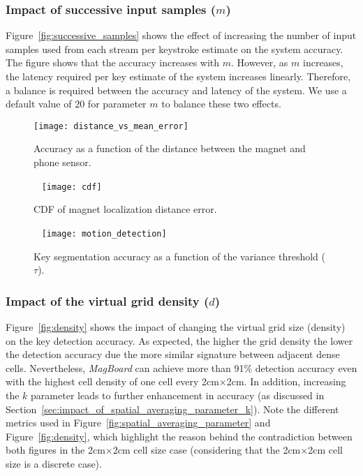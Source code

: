 \documentclass[conference]{IEEEtran}
\def \sys {\textit{MagBoard}}
\begin{document}
\subsubsection{Impact of successive input samples ($m$)}

Figure~\ref{fig:successive_samples} shows the effect of increasing the number of input samples used from each stream per keystroke estimate on the system accuracy. The figure shows that the accuracy increases with $m$. However, as $m$ increases, the latency required per key estimate of the system increases linearly. Therefore, a balance is required between the accuracy and latency of the system. We use a default value of $20$ for parameter $m$ to balance these two effects. 

\begin{figure*}[!t]
 \texttt{[image: distance\_vs\_mean\_error]}
\caption{
Accuracy as a function of the distance between the magnet and phone sensor.}
\label{fig:distance_accuracy}
\endminipage\hfill~
  \texttt{[image: cdf]}
\caption{CDF of magnet localization distance error.}
\label{fig:cdf}
\endminipage\hfill~
\texttt{[image: motion\_detection]}
\caption{Key segmentation accuracy as a function of the variance threshold ($\tau$).}
\label{fig:motion_detection_accuracy}
\endminipage
\vspace{-0.2in}
\end{figure*}

\subsubsection{Impact of the virtual grid density ($d$)}
Figure~\ref{fig:density} shows the impact of changing the virtual grid size (density) on the key detection accuracy. As expected, the higher the grid density the lower the detection accuracy due the more similar signature between adjacent dense cells. Nevertheless, \sys{} can achieve more than 91\% detection accuracy even with the highest cell density of one cell every 2cm$\times$2cm. In addition, increasing the $k$ parameter leads to further enhancement in accuracy (as discussed in Section~\ref{sec:impact_of_spatial_averaging_parameter_k}). Note the different metrics used in  Figure~\ref{fig:spatial_averaging_parameter} and Figure~\ref{fig:density}, which highlight the reason behind the contradiction between both figures in the 2cm$\times$2cm cell size case (considering that the 2cm$\times$2cm cell size is a discrete case). 
\end{document}
